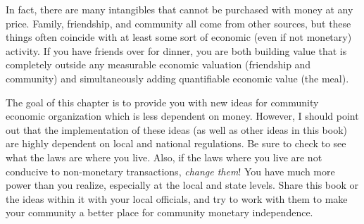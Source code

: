 In fact, there are many intangibles that cannot be purchased with money
at any price. Family, friendship, and community all come from other
sources, but these things often coincide with at least some sort of
economic (even if not monetary) activity. If you have friends over for
dinner, you are both building value that is completely outside any
measurable economic valuation (friendship and community) and
simultaneously adding quantifiable economic value (the meal).

\begin{infonote}
The goal of this chapter is to provide you with new ideas for community
economic organization which is less dependent on money.  However, I
should point out that the implementation of these ideas (as well as other
ideas in this book) are highly dependent on local and national regulations.
Be sure to check to see what the laws are where you live.  Also, if the
laws where you live are not conducive to non-monetary transactions, 
\textit{change them}!  You have much more power than you realize, especially
at the local and state levels.  Share
this book or the ideas within it with your local officials, and try to
work with them to make your community a better place for community 
monetary independence.
\end{infonote}

